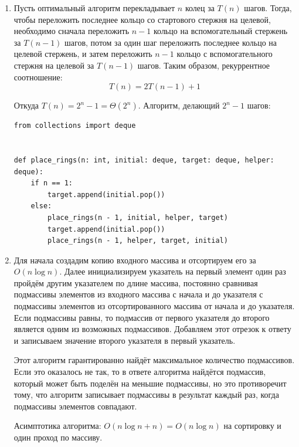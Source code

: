 \documentclass{article}
\begin{document}
\begin{enumerate}
    \item
          Пусть оптимальный алгоритм перекладывает
          $n$ колец за $T(n)$ шагов. Тогда, чтобы переложить
          последнее кольцо со стартового стержня на целевой,
          необходимо сначала переложить $n - 1$ кольцо на
          вспомогательный стержень за $T(n - 1)$ шагов,
          потом за один шаг переложить последнее кольцо
          на целевой стержень, и затем переложить $n - 1$
          кольцо с вспомогательного стержня на целевой за
          $T(n - 1)$ шагов. Таким образом, рекуррентное
          соотношение:
          \[
              T(n) = 2T(n - 1) + 1
          \]

          Откуда $T(n) = 2^n - 1 = \Theta(2^n)$.
          Алгоритм, делающий $2^n - 1$ шагов:
          \begin{lstlisting}
from collections import deque


def place_rings(n: int, initial: deque, target: deque, helper: deque):
    if n == 1:
        target.append(initial.pop())
    else:
        place_rings(n - 1, initial, helper, target)
        target.append(initial.pop())
        place_rings(n - 1, helper, target, initial)
          \end{lstlisting}

    \item
          Для начала создадим копию входного массива
          и отсортируем его за $O(n \log n)$. Далее
          инициализируем указатель на первый элемент
          один раз пройдём другим указателем по длине
          массива, постоянно сравнивая подмассивы
          элементов из входного массива с начала
          и до указателя с подмассивы элементов из
          отсортированного массива от начала и до
          указателя. Если подмассивы равны, то подмассив
          от первого указателя до второго является
          одним из возможных подмассивов. Добавляем этот
          отрезок к ответу и записываем значение
          второго указателя в первый указатель.

          Этот алгоритм гарантированно найдёт максимальное
          количество подмассивов. Если это оказалось не так,
          то в ответе алгоритма найдётся подмассив, который
          может быть поделён на меньшие подмассивы, но
          это противоречит тому, что алгоритм записывает
          подмассивы в результат каждый раз, когда подмассивы
          элементов совпадают.

          Асимптотика алгоритма:
          $O(n \log n + n) = O(n \log n)$ на сортировку
          и один проход по массиву.


\end{enumerate}
\end{document}
